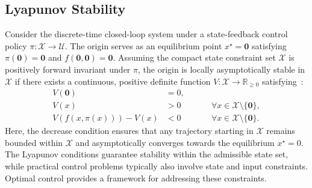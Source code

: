 \subsection{Lyapunov Stability}
\label{subsec:lyapunov-stability}
Consider the discrete-time closed-loop system under a state-feedback control policy 
$\pi: \mathcal{X} \to \mathcal{U}$. The origin serves as an equilibrium point  $x^\star = \mathbf{0}$ 
satisfying $\pi(\mathbf{0}) = \mathbf{0}$ and $f(\mathbf{0}, \mathbf{0}) = \mathbf{0}$.
Assuming the compact state constraint set $\mathcal{X}$ is positively forward invariant under $\pi$, 
the origin is locally asymptotically stable in $\mathcal{X}$ if there exists a continuous, positive definite function 
$V: \mathcal{X} \to \mathbb{R}_{\ge 0}$ satisfying~:
\begin{equation}
    \label{eq:asymptotic-lyapunov-stability}
    \begin{aligned}
        V(\mathbf{0}) &= 0, \\
        V(x) &> 0 \qquad && \forall x \in \mathcal{X} \setminus \{\mathbf{0}\}, \\
        V(f(x, \pi(x))) - V(x) &< 0 \qquad && \forall x \in \mathcal{X} \setminus \{\mathbf{0}\}.
    \end{aligned}
\end{equation}
Here, the decrease condition ensures that any trajectory starting in $\mathcal{X}$
remains bounded within $\mathcal{X}$ and asymptotically converges towards the equilibrium $x^\star = 0$.
The Lyapunov conditions guarantee stability within the admissible state set, 
while practical control problems typically also involve state and input constraints. 
Optimal control provides a framework for addressing these constraints.
